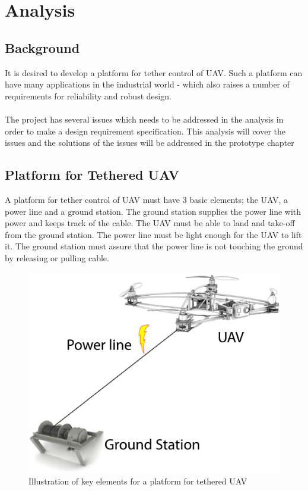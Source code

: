 
\chapter{Analysis}

\section{Background}
It is desired to develop a platform for tether control of UAV. Such a platform can have many applications in the industrial world - which also raises a number of requirements for reliability and robust design. \\
\\
The project has several issues which needs to be addressed in the analysis in order to make a design requirement specification. This analysis will cover the issues and the solutions of the issues will be addressed in the prototype chapter 


\section{Platform for Tethered UAV}
A platform for tether control of UAV must have 3 basic elements; the UAV, a power line and a ground station. The ground station supplies the power line with power and keeps track of the cable. The UAV must be able to land and take-off from the ground station. The power line must be light enough for the UAV to lift it. The ground station must assure that the power line is not touching the ground by releasing or pulling cable.

\begin{figure}[H]
\centering
\includegraphics[scale=0.5]{graphics/overall-system.png}
\caption{Illustration of key elements for a platform for tethered UAV}
\end{figure}


